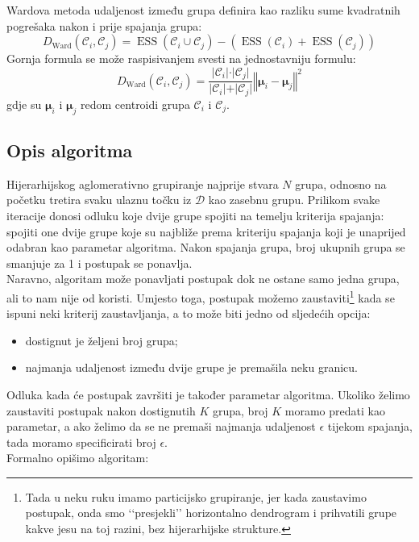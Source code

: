 \documentclass[times, utf8, zavrsni]{fer}
\begin{document}
Wardova metoda udaljenost između grupa definira kao razliku sume kvadratnih pogrešaka nakon i prije spajanja grupa:
\[D_{\text{Ward}} \left( \mathcal{C}_i, \mathcal{C}_j \right) 
= \operatorname{ESS} \left(\mathcal{C}_i \cup \mathcal{C}_j\right) - \left(\operatorname{ESS} \left(\mathcal{C}_i\right) + \operatorname{ESS} \left(\mathcal{C}_j\right)\right)
\]
Gornja formula se može raspisivanjem svesti na jednostavniju formulu:
\[D_{\text{Ward}} \left( \mathcal{C}_i, \mathcal{C}_j \right)
= \frac{\vert \mathcal{C}_i \vert \cdot \vert \mathcal{C}_j \vert}
{\vert \mathcal{C}_i \vert + \vert \mathcal{C}_j \vert}
\left\Vert \boldsymbol{\mu}_i - \boldsymbol{\mu}_j \right\Vert^2
\]
gdje su $\boldsymbol{\mu}_i$ i $\boldsymbol{\mu}_j$ redom centroidi grupa $\mathcal{C}_i$ i $\mathcal{C}_j$.

\subsection{Opis algoritma}
Hijerarhijskog aglomerativno grupiranje najprije stvara $N$ grupa, odnosno na početku tretira svaku ulaznu točku iz $\mathcal{D}$ kao zasebnu grupu. Prilikom svake iteracije donosi odluku koje dvije grupe spojiti na temelju kriterija spajanja: spojiti one dvije grupe koje su najbliže prema kriteriju spajanja koji je unaprijed odabran kao parametar algoritma. Nakon spajanja grupa, broj ukupnih grupa se smanjuje za 1 i postupak se ponavlja.\\
Naravno, algoritam može ponavljati postupak dok ne ostane samo jedna grupa, ali to nam nije od koristi. Umjesto toga, postupak možemo zaustaviti\footnote{Tada u neku ruku imamo particijsko grupiranje, jer kada zaustavimo postupak, onda smo ‘‘presjekli’’ horizontalno dendrogram i prihvatili grupe kakve jesu na toj razini, bez hijerarhijske strukture.} kada se ispuni neki kriterij zaustavljanja, a to može biti jedno od sljedećih opcija:
\begin{itemize}
    \item dostignut je željeni broj grupa;
    \item najmanja udaljenost između dvije grupe je premašila neku granicu.
\end{itemize}
Odluka kada će postupak završiti je također parametar algoritma. Ukoliko želimo zaustaviti postupak nakon dostignutih $K$ grupa, broj $K$ moramo predati kao parametar, a ako želimo da se ne premaši najmanja udaljenost $\epsilon$ tijekom spajanja, tada moramo specificirati broj $\epsilon$.\\
Formalno opišimo algoritam:
\end{document}
